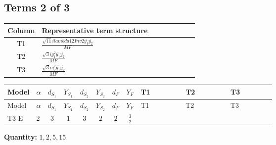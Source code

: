 \documentclass[8pt]{article}
\begin{document}
\begin{landscape}
\subsection*{Terms 2 of 3}
\begin{center}
\begin{tabular}{@{}c >{\raggedright\arraybackslash}p{0.82\linewidth}@{}}
\toprule
Column & Representative term structure \\
\midrule
T1 & \(\displaystyle \frac{\sqrt{11} i lambda12Inv2 \overline{y_{1}} \overline{y_{2}}}{MF}\) \\
\midrule
T2 & \(\displaystyle \frac{\sqrt{3} i g_{1}^{2} \overline{y_{1}} \overline{y_{2}}}{MF}\) \\
\midrule
T3 & \(\displaystyle \frac{\sqrt{3} i g_{2}^{2} \overline{y_{1}} \overline{y_{2}}}{MF}\) \\
\midrule
\bottomrule
\end{tabular}
\end{center}
\smallskip
\tiny
\begin{longtable}{@{}llcccccc >{\raggedright\arraybackslash}p{0.21\linewidth} >{\raggedright\arraybackslash}p{0.21\linewidth} >{\raggedright\arraybackslash}p{0.21\linewidth}@{}}
\toprule
Model & $\alpha$ & $d_{S_1}$ & $Y_{S_1}$ & $d_{S_2}$ & $Y_{S_2}$ & $d_F$ & $Y_F$ & T1 & T2 & T3 \\
\midrule
\endfirsthead
\toprule
Model & $\alpha$ & $d_{S_1}$ & $Y_{S_1}$ & $d_{S_2}$ & $Y_{S_2}$ & $d_F$ & $Y_F$ & T1 & T2 & T3 \\
\midrule
\endhead
T3-E & $2$ & $3$ & $1$ & $3$ & $2$ & $2$ & $\frac{3}{2}$ & \scriptsize\adjustbox{max width=\linewidth}{$\begin{gathered} \frac{3 \sqrt{11} i lambda12Inv2 \overline{y_{1}} \overline{y_{2}}}{22 MF}\end{gathered}$} & \scriptsize\adjustbox{max width=\linewidth}{$\begin{gathered} \frac{9 \sqrt{3} i g_{1}^{2} \overline{y_{1}} \overline{y_{2}}}{8 MF}\end{gathered}$} & \scriptsize\adjustbox{max width=\linewidth}{$\begin{gathered} \frac{15 \sqrt{3} i g_{2}^{2} \overline{y_{1}} \overline{y_{2}}}{8 MF}\end{gathered}$} \\
\midrule
\bottomrule
\end{longtable}
\clearpage
\noindent\textbf{Quantity: }$\mathrm{1,2,5,15}$\par\smallskip

\end{landscape}
\end{document}
